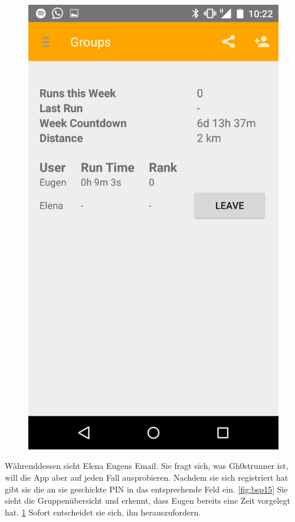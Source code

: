 \begin{figure}[!h]
\begin{minipage}{.4\textwidth}
  \includegraphics[width=.8\linewidth]{abb/bsp/bsp16}
  \label{fig:bsp16}
\end{minipage}
\end{figure}

Währenddessen sieht Elena Eugens Email. Sie fragt sich, was Gh0strunner ist, will die App aber auf jeden Fall ausprobieren. Nachdem sie sich registriert hat gibt sie die an sie geschickte PIN in das entsprechende Feld ein. \ref{fig:bsp15} Sie sieht die Gruppenübersicht und erkennt, dass Eugen bereits eine Zeit vorgelegt hat. \ref{fig:bsp16} Sofort entscheidet sie sich, ihn herauszufordern.

